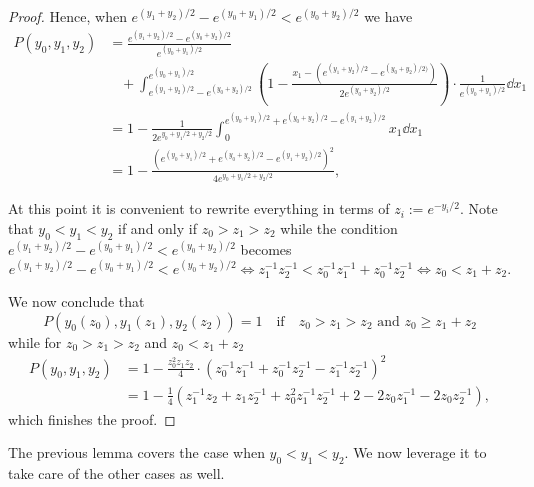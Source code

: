 \begin{proof}
Hence, when $e^{(y_1+y_2)/2} - e^{(y_0+y_1)/2} < e^{(y_0+y_2)/2}$ we have
\begin{align*}
	P(y_0,y_1,y_2) &= \frac{e^{(y_1+y_2)/2} - e^{(y_0+y_2)/2} }{ e^{(y_0+y_1)/2} }  \\
	&\hspace{10pt}+ \int_{ e^{(y_1+y_2)/2} - e^{(y_0+y_2)/2} }^{ e^{(y_0+y_1)/2} } 
	    \left(1 - \frac{x_1 - (e^{(y_1+y_2)/2} - e^{(y_0+y_2)/2)}) }{ 2e^{(y_0+y_2)/2} }\right)
	    \cdot \frac{1}{e^{(y_0+y_1)/2}} \dd x_1 \\
	&= 1 - \frac{1}{2e^{y_0+y_1/2+y_2/2} } \int_0^{ e^{(y_0+y_1)/2}+e^{(y_0+y_2)/2}-e^{(y_1+y_2)/2} } x_1 \dd x_1 \\
	&= 1 - \frac{ \left( e^{(y_0+y_1)/2}+e^{(y_0+y_2)/2}-e^{(y_1+y_2)/2} \right)^2 }{ 4 e^{y_0+y_1/2+y_2/2} },
\end{align*}

At this point it is convenient to rewrite everything in terms of $z_i := e^{-y_i/2}$.
Note that $y_0 < y_1 < y_2$ if and only if $z_0 > z_1 > z_2$ while the condition $e^{(y_1+y_2)/2} - e^{(y_0+y_1)/2} < e^{(y_0+y_2)/2}$ becomes
\[ e^{(y_1+y_2)/2} - e^{(y_0+y_1)/2} < e^{(y_0+y_2)/2} \Leftrightarrow 
z_1^{-1} z_2^{-1} < z_0^{-1} z_1^{-1} + z_0^{-1}z_2^{-1} 
\Leftrightarrow
z_0 < z_1+z_2. 
\]

We now conclude that
\[
	P(y_0(z_0), y_1(z_1), y_2(z_2)) = 1 \quad \text{if} \quad z_0 > z_1 > z_2 \text{ and } z_0 \geq z_1 + z_2
\]
while for $z_0 > z_1 > z_2$ and $z_0 < z_1 + z_2$
\begin{align*}
	P(y_0, y_1, y_2) 
	&= 1 - \frac{z_0^2z_1z_2}{4} \cdot \left( z_0^{-1}z_1^{-1}+z_0^{-1}z_2^{-1}-z_1^{-1}z_2^{-1} \right)^2 \\
	&= 1 - \frac{1}{4} \left( z_1^{-1}z_2 + z_1z_2^{-1} + z_0^2z_1^{-1}z_2^{-1} + 2 - 2z_0z_1^{-1}-2z_0z_2^{-1}\right),
\end{align*}
which finishes the proof.
\end{proof}

The previous lemma covers the case when $y_0<y_1<y_2$. We now leverage it to take care of the other cases as well. 

